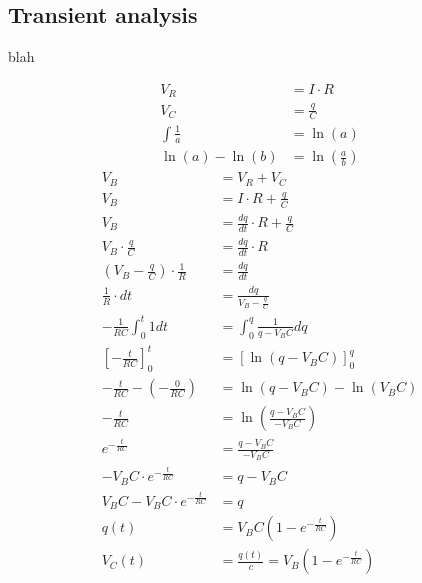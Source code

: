 \subsection{Transient analysis}
blah

\begin{align}
V_R &= I \cdot R \\
V_C &= \frac{q}{C} \\
\int \frac{1}{a} &= \ln(a) \\
\ln(a) - \ln(b) &= \ln(\frac{a}{b})
\end{align}
\begin{align*}
V_B &= V_R + V_C \\
V_B &= I \cdot R + \frac{q}{C} \\
V_B &= \frac{dq}{dt} \cdot R + \frac{q}{C} \\
V_B \cdot \frac{q}{C} &= \frac{dq}{dt} \cdot R \\
(V_B - \frac{q}{C}) \cdot \frac{1}{R} &= \frac{dq}{dt} \\
\frac{1}{R} \cdot dt &= \frac{dq}{V_B - \frac{q}{C}} \\
- \frac{1}{RC} \int_{0}^{t} 1 dt &= \int_{0}^{q} \frac{1}{q-V_B C}dq \\
[-\frac{t}{RC}]_{0}^{t} &= [\ln(q-V_B C)]_{0}^{q} \\
-\frac{t}{RC} - (-\frac{0}{RC}) &= \ln(q-V_B C) - \ln(V_B C) \\
-\frac{t}{RC} &= \ln(\frac{q-V_B C}{-V_B C}) \\
e^{-\frac{t}{RC}} &= \frac{q-V_B C}{-V_B C} \\
-V_B C \cdot e^{-\frac{t}{RC}} &= q - V_B C \\
V_B C - V_B C \cdot e^{-\frac{t}{RC}} &= q \\
q(t) &= V_B C(1-e^{-\frac{t}{RC}}) \\
V_C(t) &= \frac{q(t)}{c} = V_B (1 - e^{-\frac{t}{RC}})
\end{align*}


